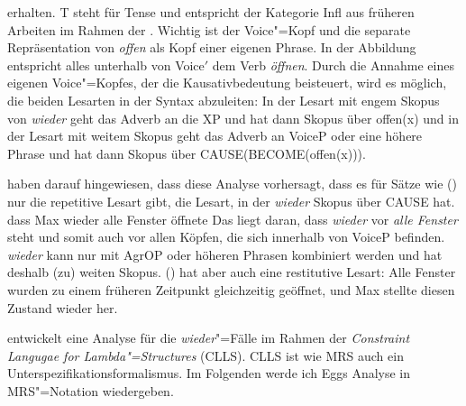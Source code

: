 erhalten. T steht für Tense und entspricht der Kategorie Infl aus
früheren Arbeiten im Rahmen der \gbt \citep[]{Chomsky86b}. Wichtig ist der
Voice"=Kopf und die separate Repräsentation von \emph{offen} als Kopf einer eigenen 
Phrase. In der Abbildung entspricht alles unterhalb von Voice$'$ dem Verb \emph{öffnen}. Durch die
Annahme eines eigenen Voice"=Kopfes, der die Kausativbedeutung beisteuert, wird es möglich, die
beiden Lesarten in der Syntax abzuleiten: In der Lesart mit engem Skopus von \emph{wieder} geht das
Adverb an die XP und hat dann Skopus über offen(x) und in der Lesart mit weitem Skopus geht
das Adverb an VoiceP oder eine höhere Phrase und hat dann Skopus über CAUSE(BECOME(offen(x))).

\citet{JB2003a-u} haben darauf hingewiesen, dass diese Analyse vorhersagt, dass es für Sätze wie
() nur die repetitive Lesart gibt, \dash die Lesart, in der \emph{wieder} Skopus über CAUSE hat.
\ea
\label{ex-wieder-alle}
dass Max wieder alle Fenster öffnete
\z
Das liegt daran, dass \emph{wieder} vor \emph{alle Fenster} steht und somit auch vor allen Köpfen,
die sich innerhalb von VoiceP befinden. \emph{wieder} kann nur mit AgrOP oder höheren Phrasen
kombiniert werden und hat deshalb (zu) weiten Skopus. () hat aber auch eine restitutive
Lesart: Alle Fenster wurden zu einem früheren Zeitpunkt gleichzeitig geöffnet, und Max stellte
diesen Zustand wieder her.


\citet{Egg99a} entwickelt eine Analyse für die \emph{wieder}"=Fälle im Rahmen der \emph{Constraint
  Langugae for Lambda"=Structures} (CLLS). CLLS ist wie MRS auch ein
  Unterspezifikationsformalismus. Im Folgenden werde ich Eggs Analyse in MRS"=Notation
  wiedergeben.

